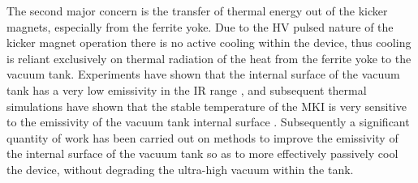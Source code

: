 The second major concern is the transfer of thermal energy out of the kicker magnets, especially from the ferrite yoke. Due to the HV pulsed nature of the kicker magnet operation there is no active cooling within the device, thus cooling is reliant exclusively on thermal radiation of the heat from the ferrite yoke to the vacuum tank. Experiments have shown that the internal surface of the vacuum tank has a very low emissivity in the IR range \cite{Barnes:emisMKI}, and subsequent thermal simulations have shown that the stable temperature of the MKI is very sensitive to the emissivity of the vacuum tank internal surface \cite{Garlasche:2dHeatEmis}. Subsequently a significant quantity of work has been carried out on methods to improve the emissivity of the internal surface of the vacuum tank so as to more effectively passively cool the device, without degrading the ultra-high vacuum within the tank.